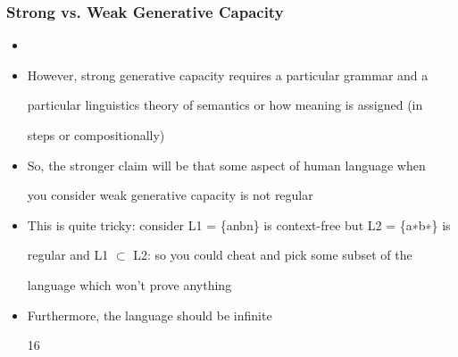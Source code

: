\documentclass[compress,color=usenames]{beamer}
\begin{document}
\begin{frame}
\frametitle{Strong vs. Weak Generative Capacity}

\begin{itemize}
\item




\item However, strong generative capacity requires a particular grammar and a


particular linguistics theory of semantics or how meaning is assigned (in


steps or compositionally)





\item So, the stronger claim will be that some aspect of human language when


you consider weak generative capacity is not regular





\item This is quite tricky: consider L1 = \{anbn\} is context-free but L2 = \{a∗b∗\} is


regular and L1 $\subset$ L2: so you could cheat and pick some subset of the


language which won't prove anything





\item Furthermore, the language should be inﬁnite


16




\end{itemize}

\end{frame}
\end{document}
